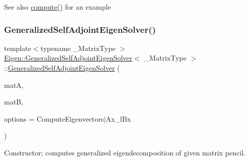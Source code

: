 \begin{DoxySeeAlso}{See also}
\mbox{\hyperlink{class_eigen_1_1_generalized_self_adjoint_eigen_solver_a724764fe196612b752042692156ed023}{compute()}} for an example 
\end{DoxySeeAlso}
\mbox{\label{class_eigen_1_1_generalized_self_adjoint_eigen_solver_addc0409c9cb1a5ac9cbbd00efe68908e}} 
\subsubsection{\texorpdfstring{GeneralizedSelfAdjointEigenSolver()}{GeneralizedSelfAdjointEigenSolver()}\hspace{0.1cm}{\footnotesize\ttfamily [3/3]}}
{\footnotesize\ttfamily template$<$typename \+\_\+\+Matrix\+Type $>$ \\
\mbox{\hyperlink{class_eigen_1_1_generalized_self_adjoint_eigen_solver}{Eigen\+::\+Generalized\+Self\+Adjoint\+Eigen\+Solver}}$<$ \+\_\+\+Matrix\+Type $>$\+::\mbox{\hyperlink{class_eigen_1_1_generalized_self_adjoint_eigen_solver}{Generalized\+Self\+Adjoint\+Eigen\+Solver}} (\begin{DoxyParamCaption}\item[{const Matrix\+Type \&}]{matA,  }\item[{const Matrix\+Type \&}]{matB,  }\item[{int}]{options = {\ttfamily ComputeEigenvectors$\vert$Ax\+\_\+lBx} }\end{DoxyParamCaption})\hspace{0.3cm}{\ttfamily [inline]}}



Constructor; computes generalized eigendecomposition of given matrix pencil. 


